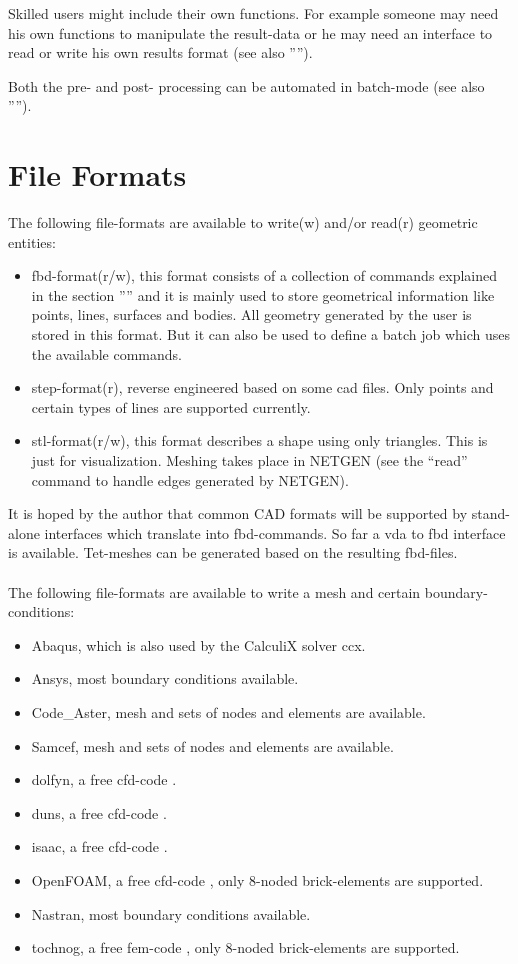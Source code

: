 \documentclass{article}
\begin{document}
Skilled users might include their own functions. For example someone may need his own functions to manipulate the result-data or he may need an interface to read or write his own results format (see also '''').

Both the pre- and post- processing can be automated in batch-mode (see also '''').


\section{\label{File Formats}File Formats}
The following file-formats are available to write(w) and/or read(r) geometric entities:
\begin{itemize}
\item fbd-format(r/w), this format consists of a collection of commands explained in the section '''' and it is mainly used to store geometrical information like points, lines, surfaces and bodies. All geometry generated by the user is stored in this format. But it can also be used to define a batch job which uses the available commands.
\item step-format(r), reverse engineered based on some cad files. Only points and certain types of lines are supported currently.
\item stl-format(r/w), this format describes a shape using only triangles. This is just for visualization. Meshing takes place in NETGEN \cite{NETGEN} (see the ``read'' command to handle edges generated by NETGEN). 
\end{itemize}
It is hoped by the author that common CAD formats will be supported by stand-alone interfaces which translate into fbd-commands. So far a vda to fbd interface is available. Tet-meshes can be generated based on the resulting fbd-files.\\\\The following file-formats are available to write a mesh and certain boundary-conditions:
\begin{itemize}
\item Abaqus, which is also used by the CalculiX solver ccx.
\item Ansys, most boundary conditions available.
\item Code\_Aster, mesh and sets of nodes and elements are available.
\item Samcef, mesh and sets of nodes and elements are available.
\item dolfyn, a free cfd-code \cite{dolfyn}.
\item duns, a free cfd-code \cite{duns}.
\item isaac, a free cfd-code \cite{isaac}.
\item OpenFOAM, a free cfd-code \cite{OpenFOAM}, only 8-noded brick-elements are supported.
\item Nastran, most boundary conditions available.
\item tochnog, a free fem-code \cite{tochnog}, only 8-noded brick-elements are supported.
\end{itemize}
\end{document}
